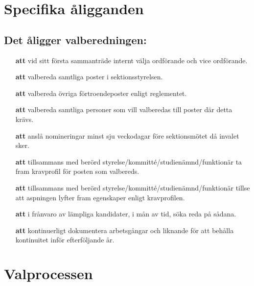 \section{Specifika åligganden}

\subsection{Det åligger valberedningen:}

\begin{itemize}

\item[\textbf{att}] vid sitt första sammanträde internt välja ordförande och vice ordförande.

\item[\textbf{att}] valbereda samtliga poster i sektionsstyrelsen.


\item[\textbf{att}] valbereda övriga förtroendeposter enligt reglementet.

\item[\textbf{att}] valbereda samtliga personer som vill valberedas till poster där detta krävs.

\item[\textbf{att}] anslå nomineringar minst sju veckodagar före sektionsmötet då invalet sker.

\item[\textbf{att}] tillsammans med berörd styrelse/kommitté/studienämnd/funktionär ta fram kravprofil för posten som valbereds. 

\item[\textbf{att}] tillsammans med berörd styrelse/kommitté/studienämnd/funktionär tillse att aspningen lyfter fram  egenskaper enligt kravprofilen.

\item[\textbf{att}] i frånvaro av lämpliga kandidater, i mån av tid, söka reda på sådana.

\item[\textbf{att}] kontinuerligt dokumentera arbetsgångar och liknande för att behålla kontinuitet inför efterföljande år.

\end{itemize}

\section{Valprocessen}

